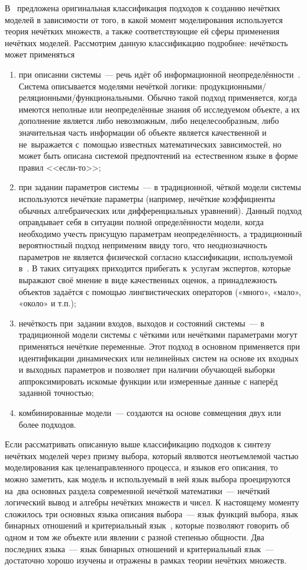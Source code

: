 В~\cite{Borisov_Fedulov} предложена оригинальная классификация подходов к созданию нечётких моделей в зависимости от того, в какой момент моделирования используется теория нечётких множеств, а также соответствующие ей сферы применения нечётких моделей. Рассмотрим данную классификацию подробнее: нечёткость может применяться
\begin{enumerate}
	\item при описании системы~--- речь идёт об информационной неопределённости~\cite{Pospelov, Borisov_Alexeev_Msk}. Система описывается моделями нечёткой логики: продукционными/реляционными/функциональными. Обычно такой подход применяется, когда имеются неполные или неопределённые знания об исследуемом объекте, а их дополнение является либо невозможным, либо нецелесообразным, либо значительная часть информации об объекте является качественной и не~выражается с~помощью известных математических зависимостей, но может быть описана системой предпочтений на~естественном языке в форме правил <<если-то>>;
	\item при задании параметров системы~--- в традиционной, чёткой модели системы используются нечёткие параметры (например, нечёткие коэффициенты обычных алгебраических или дифференциальных уравнений). Данный подход оправдывает себя в ситуации полной определённости модели, когда необходимо учесть присущую параметрам неопределённость, а традиционный вероятностный подход неприменим ввиду того, что неоднозначность параметров не является физической согласно классификации, используемой в~\cite{Borisov_Alexeev_Msk}. В таких ситуациях приходится прибегать к~услугам экспертов, которые выражают своё мнение в виде качественных оценок, а принадлежность объектов задаётся с помощью лингвистических операторов («много», «мало», «около» и т.п.);
	\item нечёткость при~задании входов, выходов и состояний системы~--- в традиционной модели системы с чёткими или нечёткими параметрами могут применяться нечёткие переменные. Этот подход в основном применяется при идентификации динамических или нелинейных систем на основе их входных и выходных параметров и позволяет при наличии обучающей выборки аппроксимировать искомые функции или измеренные данные с наперёд заданной точностью;
	\item комбинированные модели~--- создаются на основе совмещения двух или более подходов.
\end{enumerate}

Если рассматривать описанную выше классификацию подходов к синтезу нечётких моделей через призму выбора, который являются неотъемлемой частью моделирования как целенаправленного процесса, и языков его описания, то можно заметить, как модель и используемый в ней язык выбора проецируются на~два основных раздела современной нечёткой математики~--- нечёткий логический вывод и алгебры нечётких множеств и чисел. К настоящему моменту сложилось три основных языка описания выбора~--- язык функций выбора, язык бинарных отношений и критериальный язык~\cite{Choice_Languages}, которые позволяют говорить об одном и том же объекте или явлении с разной степенью общности. Два последних языка~--- язык бинарных отношений и критериальный язык~--- достаточно хорошо изучены и отражены в рамках теории нечётких множеств.

